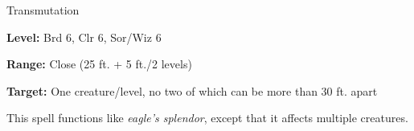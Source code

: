 \label{spell:Mass Eagle's Splendor}

Transmutation

\textbf{Level:} Brd 6, Clr 6, Sor/Wiz 6

\textbf{Range:} Close (25 ft. + 5 ft./2 levels)

\textbf{Target:} One creature/level, no two of which can be more than 30 ft. apart

This spell functions like \textit{eagle's splendor}, except that it affects multiple 
creatures.

